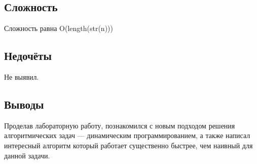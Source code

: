 \documentclass[12pt]{article}
\begin{document}
    \subsection*{Сложность}

    Сложность равна O(length(str(n)))

    \subsection*{Недочёты}

    Не выявил.

    \subsection*{Выводы}

    Проделав лабораторную работу, познакомился с новым подходом решения 
    алгоритмических задач — динамическим программированием, а также написал интересный алгоритм который работает существенно быстрее, чем наивный для данной задачи.
\end{document}
